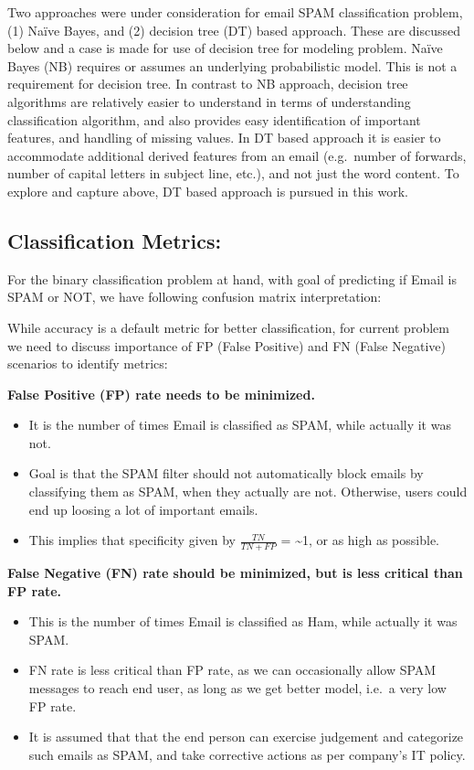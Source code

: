 \documentclass[
]{article}
\providecommand{\tightlist}{%
  \setlength{\itemsep}{0pt}\setlength{\parskip}{0pt}}
\begin{document}
Two approaches were under consideration for email SPAM classification
problem, (1) Naïve Bayes, and (2) decision tree (DT) based approach.
These are discussed below and a case is made for use of decision tree
for modeling problem. Naïve Bayes (NB) requires or assumes an underlying
probabilistic model. This is not a requirement for decision tree. In
contrast to NB approach, decision tree algorithms are relatively easier
to understand in terms of understanding classification algorithm, and
also provides easy identification of important features, and handling of
missing values. In DT based approach it is easier to accommodate
additional derived features from an email (e.g.~number of forwards,
number of capital letters in subject line, etc.), and not just the word
content. To explore and capture above, DT based approach is pursued in
this work.

\hypertarget{classification-metrics}{%
\subsection{Classification Metrics:}\label{classification-metrics}}

For the binary classification problem at hand, with goal of predicting
if Email is SPAM or NOT, we have following confusion matrix
interpretation:

While accuracy is a default metric for better classification, for
current problem we need to discuss importance of FP (False Positive) and
FN (False Negative) scenarios to identify metrics:

\textbf{False Positive (FP) rate needs to be minimized.}

\begin{itemize}
\tightlist
\item
  It is the number of times Email is classified as SPAM, while actually
  it was not.
\item
  Goal is that the SPAM filter should not automatically block emails by
  classifying them as SPAM, when they actually are not. Otherwise, users
  could end up loosing a lot of important emails.
\item
  This implies that specificity given by \(\frac{TN}{TN+FP}\) =
  \textasciitilde1, or as high as possible.
\end{itemize}

\textbf{False Negative (FN) rate should be minimized, but is less
critical than FP rate.}

\begin{itemize}
\tightlist
\item
  This is the number of times Email is classified as Ham, while actually
  it was SPAM.
\item
  FN rate is less critical than FP rate, as we can occasionally allow
  SPAM messages to reach end user, as long as we get better model,
  i.e.~a very low FP rate.
\item
  It is assumed that that the end person can exercise judgement and
  categorize such emails as SPAM, and take corrective actions as per
  company's IT policy.
\end{itemize}
\end{document}
